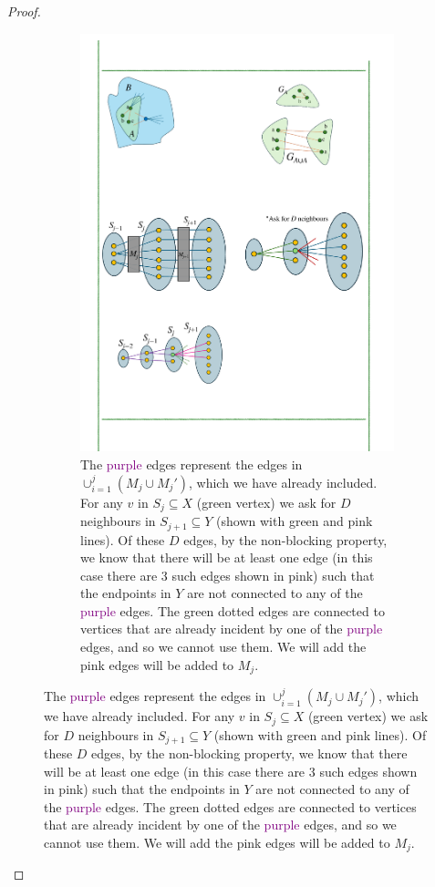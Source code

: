 \documentclass[11pt]{article}
\begin{document}
\begin{proof}
\begin{figure}[t!]
    \centering
    \begin{subfigure}[t]{0.95\textwidth}
        \centering
        \includegraphics{assets/embeddingA.pdf}
        \caption{The \textcolor{purple}{purple} edges represent the edges in $\cup_{i=1}^j (M_j \cup M_j')$, which we have already included.
        For any $v$ in $S_j \subseteq X$ (\textcolor{cadmiumgreen}{green vertex}) we ask for $D$ neighbours in $S_{j+1} \subseteq Y$ (shown with \textcolor{cadmiumgreen}{green} and \textcolor{carminepink}{pink} lines). 
        Of these $D$ edges, by the non-blocking property, we know that there will be at least one edge (in this case there are 3 such edges shown in \textcolor{carminepink}{pink}) such that the endpoints in $Y$ are not connected to any of the \textcolor{purple}{purple} edges. The \textcolor{cadmiumgreen}{green} dotted edges are connected to vertices that are already incident by one of the \textcolor{purple}{purple} edges, and so we cannot use them. We will add the \textcolor{carminepink}{pink} edges will be added to $M_j$.}

\end{subfigure}
\end{figure}
\end{proof}
\end{document}
